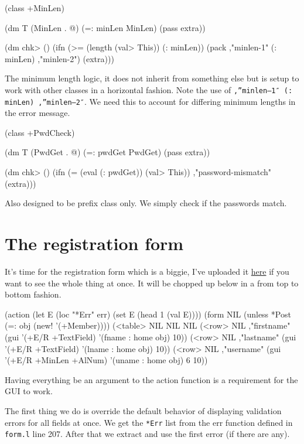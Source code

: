 \begin{wideverbatim}
(class +MinLen)

(dm T (MinLen . @)
  (=: minLen MinLen)
  (pass extra))

(dm chk> ()
  (ifn 
     (>= (length (val> This)) (: minLen)) 
     (pack ,"minlen-1" (: minLen) ,"minlen-2") 
     (extra)))
\end{wideverbatim}

The minimum length logic, it does not inherit from something else but
is setup to work with other classes in a horizontal fashion. Note the
use of \texttt{,”minlen--1″ (: minLen) ,”minlen--2″}. We need this to
account for differing minimum lengths in the error message.

\begin{wideverbatim}
(class +PwdCheck)

(dm T (PwdGet . @)
  (=: pwdGet PwdGet)
  (pass extra))

(dm chk> ()
  (ifn (= (eval (: pwdGet)) (val> This)) ,"password-mismatch" (extra)))
\end{wideverbatim}

Also designed to be prefix class only. We simply check if the passwords
match.


\section{The registration form}
\label{sec:registration-form}

It's time for the registration form which is a biggie, I've uploaded it
\href{http://www.prodevtips.com/wp-content/uploads/2008/08/reg-form.l}{here}
if you want to see the whole thing at once. It will be chopped up below
in a from top to bottom fashion.

\begin{wideverbatim}
(action
    (let E (loc "*Err" err) 
       (set E (head 1 (val E))))
    (form NIL
       (unless *Post (=: obj (new! '(+Member))))
       (<table> NIL NIL NIL
          (<row> NIL ,"firstname" (gui '(+E/R +TextField)   
                '(fname : home obj) 10))
          (<row> NIL ,"lastname"  (gui '(+E/R +TextField) 
                 '(lname : home obj) 10))
          (<row> NIL ,"username"  (gui '(+E/R +MinLen +AlNum) 
                 '(uname : home obj) 6 10))
\end{wideverbatim}

Having everything be an argument to the action function is a requirement
for the GUI to work.

The first thing we do is override the default behavior of displaying
validation errors for all fields at once. We get the \texttt{*Err}
list from the err function defined in \texttt{form.l} line 207. After
that we extract and use the first error (if there are any).

